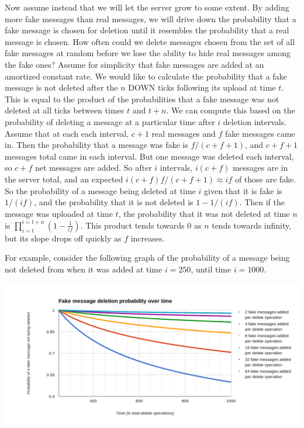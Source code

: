 \documentclass[pageno]{jpaper}
\begin{document}
Now assume instead that we will let the server grow to some extent. By adding more fake messages than real messages, we will drive down the probability that a fake message is chosen for deletion until it resembles the probability that a real message is chosen. How often could we delete messages chosen from the set of all fake messages at random before we lose the ability to hide real messages among the fake ones? Assume for simplicity that fake messages are added at an amortized constant rate. We would like to calculate the probability that a fake message is not deleted after the $n$ DOWN ticks following its upload at time $t$. This is equal to the product of the probabilities that a fake message was not deleted at all ticks between times $t$ and $t+n$. We can compute this based on the probability of deleting a message at a particular time after $i$ deletion intervals. Assume that at each each interval, $c+1$ real messages and $f$ fake messages came in. Then the probability that a message was fake is $f/(c+f+1)$, and $c+f+1$ messages total came in each interval. But one message was deleted each interval, so $c+f$ net messages are added. So after $i$ intervals, $i(c+f)$ messages are in the server total, and an expected $i(c+f)f/(c+f+1)\approx if$ of those are fake. So the probability of a message being deleted at time $i$ given that it is fake is $1/(if)$, and the probability that it is not deleted is $1-1/(if)$. Then if the message was uploaded at time $t$, the probability that it was not deleted at time $n$ is $\displaystyle\prod_{i=t}^{i=t+n}(1-\frac{1}{if})$. This product tends towards 0 as $n$ tends towards infinity, but its slope drops off quickly as $f$ increases.

For example, consider the following graph of the probability of a message being not deleted from when it was added at time $i=250$, until time $i=1000$.

\includegraphics[width=\textwidth]{many_lines_2}
\end{document}
